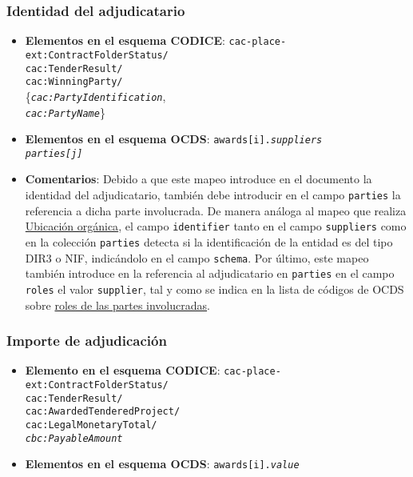         \subsubsection{Identidad del adjudicatario}
            \begin{itemize}
                \item \textbf{Elementos en el esquema CODICE}:
                    \tabto{7.6cm} \texttt{cac-place-ext:ContractFolderStatus/} \\
                    \tabto{7.6cm} \texttt{cac:TenderResult/} \\
                    \tabto{7.6cm} \texttt{cac:WinningParty/} \\
                    \tabto{7.7cm} \{\texttt{\textit{cac:PartyIdentification}}, \\
                    \tabto{7.7cm} \texttt{\textit{cac:PartyName}}\}
                \item \textbf{Elementos en el esquema OCDS}:
                    \tabto{7.6cm} \texttt{awards[i].\textit{suppliers}} \\
                    \tabto{7.6cm} \texttt{\textit{parties[j]}}
                \item \textbf{Comentarios}: Debido a que este mapeo introduce en el documento la identidad del adjudicatario, también debe introducir en el campo \texttt{parties} la referencia a dicha parte involucrada. De manera análoga al mapeo que realiza  \hyperref[subsec:UbicacionOrganica]{Ubicación orgánica}, el campo \texttt{identifier} tanto en el campo \texttt{suppliers} como en la colección \texttt{parties} detecta si la identificación de la entidad es del tipo DIR3 o NIF, indicándolo en el campo \texttt{schema}. Por último, este mapeo también introduce en la referencia al adjudicatario en \texttt{parties} en el campo \texttt{roles} el valor \texttt{supplier}, tal y como se indica en la lista de códigos de OCDS sobre \href{https://standard.open-contracting.org/latest/en/schema/codelists/#party-role}{roles de las partes involucradas}.
            \end{itemize}
            
        \subsubsection{Importe de adjudicación}
            \begin{itemize}
                \item \textbf{Elemento en el esquema CODICE}:
                    \tabto{7.6cm} \texttt{cac-place-ext:ContractFolderStatus/} \\
                    \tabto{7.6cm} \texttt{cac:TenderResult/} \\
                    \tabto{7.6cm} \texttt{cac:AwardedTenderedProject/} \\
                    \tabto{7.6cm} \texttt{cac:LegalMonetaryTotal/} \\
                    \tabto{7.6cm} \texttt{\textit{cbc:PayableAmount}}
                \item \textbf{Elementos en el esquema OCDS}:
                    \tabto{7.6cm} \texttt{awards[i].\textit{value}}
            \end{itemize}
            
